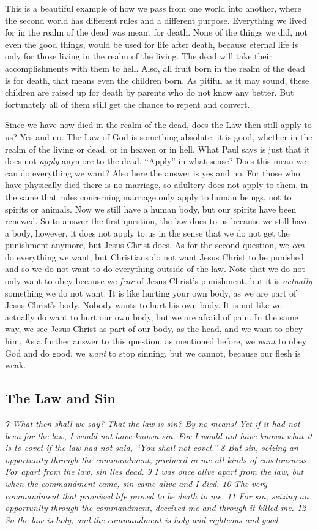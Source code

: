 This is a beautiful example of how we pass from one world into another,
where the second world has different rules and a different purpose.
Everything we lived for in the realm of the dead was meant for death.
None of the things we did, not even the good things, would be used for
life after death, because eternal life is only for those living in the
realm of the living. The dead will take their accomplishments with them
to hell. Also, all fruit born in the realm of the dead is for death,
that means even the children born. As pitiful as it may sound, these
children are raised up for death by parents who do not know any better.
But fortunately all of them still get the chance to repent and convert.

Since we have now died in the realm of the dead, does the Law then still
apply to us? Yes and no. The Law of God is something absolute, it is
good, whether in the realm of the living or dead, or in heaven or in
hell. What Paul says is just that it does not \emph{apply} anymore to
the dead. ``Apply'' in what sense? Does this mean we can do everything
we want? Also here the answer is yes and no. For those who have
physically died there is no marriage, so adultery does not apply to
them, in the same that rules concerning marriage only apply to human
beings, not to spirits or animals. Now we still have a human body, but
our spirits have been renewed. So to answer the first question, the law
does to us because we still have a body, however, it does not apply to
us in the sense that we do not get the punishment anymore, but Jesus
Christ does. As for the second question, we \emph{can} do everything we
want, but Christians do not want Jesus Christ to be punished and so we
do not want to do everything outside of the law. Note that we do not
only want to obey because we \emph{fear} of Jesus Christ's punishment,
but it is \emph{actually} something we do not want. It is like hurting
your own body, as we are part of Jesus Christ's body. Nobody wants to
hurt his own body. It is not like we actually do want to hurt our own
body, but we are afraid of pain. In the same way, we see Jesus Christ as
part of our body, as the head, and we want to obey him. As a further
answer to this question, as mentioned before, we \emph{want} to obey God
and do good, we \emph{want} to stop sinning, but we cannot, because our
flesh is weak.

\subsection{The Law and Sin} \emph{7 What then shall we say? That the law is
sin? By no means! Yet if it had not been for the law, I would not have
known sin. For I would not have known what it is to covet if the law had
not said, ``You shall not covet.'' 8 But sin, seizing an opportunity
through the commandment, produced in me all kinds of covetousness. For
apart from the law, sin lies dead. 9 I was once alive apart from the
law, but when the commandment came, sin came alive and I died. 10 The
very commandment that promised life proved to be death to me. 11 For
sin, seizing an opportunity through the commandment, deceived me and
through it killed me. 12 So the law is holy, and the commandment is holy
and righteous and good.}

